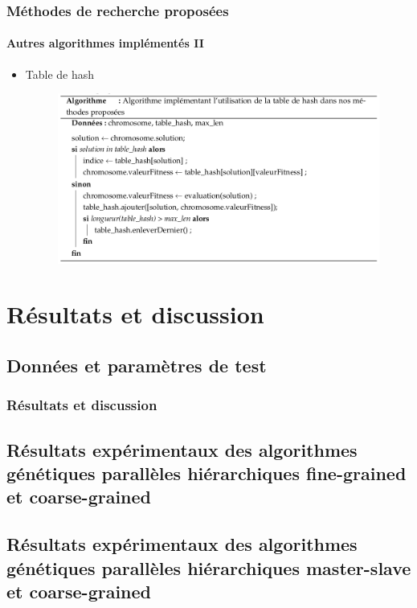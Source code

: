\documentclass[11pt]{beamer}
\begin{document}
 \begin{frame}
 \frametitle{Méthodes de recherche proposées}
 \framesubtitle{Autres algorithmes implémentés II}
	
	\begin{itemize}
		\item Table de hash
		\begin{figure}[!h]
		\begin{center}
			\includegraphics[scale=.4
			]{img/hash_table_algo.png}
		\end{center}
 \end{figure}
	\end{itemize}
	
 \end{frame}
 
 
 
 \section{Résultats et discussion}
 \subsection{Données et paramètres de test}
 \begin{frame}
 \frametitle{Résultats et discussion}
 \end{frame}
 
 \subsection{Résultats expérimentaux des algorithmes génétiques parallèles hiérarchiques fine-grained et coarse-grained}
 
 \subsection{Résultats expérimentaux des algorithmes génétiques parallèles hiérarchiques master-slave et coarse-grained}
\end{document}
